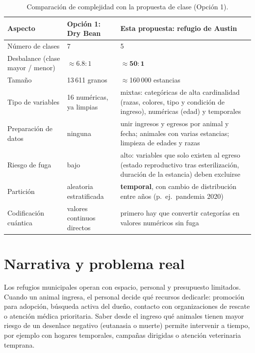 \documentclass[11pt,letterpaper]{article}
\begin{document}
\begin{table}[H]
\centering\small
\caption{Comparación de complejidad con la propuesta de clase (Opción 1).}
\label{tab:complejidad}
\begin{tabular}{@{}p{4.6cm}p{4.4cm}p{5.8cm}@{}}
\toprule
Aspecto & Opción 1: Dry Bean & Esta propuesta: refugio de Austin \\ \midrule
Número de clases & 7 & 5 \\
Desbalance (clase mayor / menor) & $\approx 6.8:1$ & $\approx \mathbf{50:1}$ \\
Tamaño & 13\,611 granos & $\approx$160\,000 estancias \\
Tipo de variables & 16 numéricas, ya limpias & mixtas: categóricas de alta cardinalidad
(razas, colores, tipo y condición de ingreso), numéricas (edad) y temporales \\
Preparación de datos & ninguna & unir ingresos y egresos por animal y fecha; animales con varias
estancias; limpieza de edades y razas \\
Riesgo de fuga & bajo & alto: variables que solo existen al egreso (estado reproductivo tras
esterilización, duración de la estancia) deben excluirse \\
Partición & aleatoria estratificada & \textbf{temporal}, con cambio de distribución entre años
(p.\ ej.\ pandemia 2020) \\
Codificación cuántica & valores continuos directos & primero hay que convertir categorías en
valores numéricos sin fuga \\
\bottomrule
\end{tabular}
\end{table}

\section{Narrativa y problema real}
Los refugios municipales operan con espacio, personal y presupuesto limitados. Cuando un animal
ingresa, el personal decide qué recursos dedicarle: promoción para adopción, búsqueda activa del
dueño, contacto con organizaciones de rescate o atención médica prioritaria. Saber desde el ingreso
qué animales tienen mayor riesgo de un desenlace negativo (eutanasia o muerte) permite intervenir a
tiempo, por ejemplo con hogares temporales, campañas dirigidas o atención veterinaria temprana.
\end{document}
